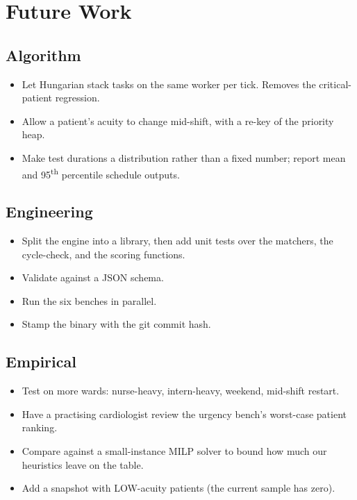 \section{Future Work}
\label{sec:future}

\subsection{Algorithm}

\begin{itemize}
  \item Let Hungarian stack tasks on the same worker per tick.
        Removes the critical-patient regression.
  \item Allow a patient's acuity to change mid-shift, with a
        re-key of the priority heap.
  \item Make test durations a distribution rather than a fixed
        number; report mean and 95\textsuperscript{th} percentile
        schedule outputs.
\end{itemize}

\subsection{Engineering}

\begin{itemize}
  \item Split the engine into a library, then add unit tests over
        the matchers, the cycle-check, and the scoring functions.
  \item Validate  against a JSON schema.
  \item Run the six benches in parallel.
  \item Stamp the binary with the git commit hash.
\end{itemize}

\subsection{Empirical}

\begin{itemize}
  \item Test on more wards: nurse-heavy, intern-heavy, weekend,
        mid-shift restart.
  \item Have a practising cardiologist review the urgency bench's
        worst-case patient ranking.
  \item Compare against a small-instance MILP solver to bound how
        much our heuristics leave on the table.
  \item Add a snapshot with LOW-acuity patients (the current
        sample has zero).
\end{itemize}
